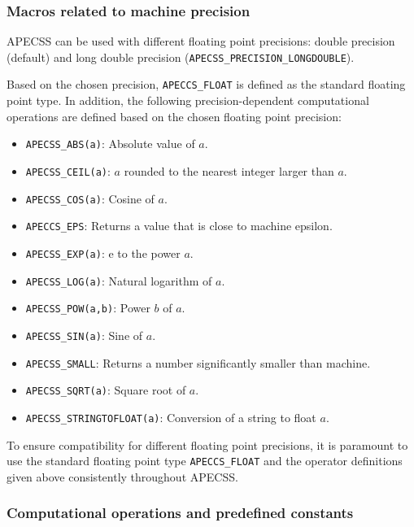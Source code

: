 \subsubsection{Macros related to machine precision}

APECSS can be used with different floating point precisions: double precision (default) and long double precision ({\tt APECSS\_PRECISION\_LONGDOUBLE}).

Based on the chosen precision, {\tt APECCS\_FLOAT} is defined as the standard floating point type. In addition, the following precision-dependent computational operations are defined based on the chosen floating point precision:\vspace{-1em}
\begin{itemize}[noitemsep]
  \item {\tt APECSS\_ABS(a)}: Absolute value of $a$.
  \item {\tt APECSS\_CEIL(a)}: $a$ rounded to the nearest integer larger than $a$.
  \item {\tt APECSS\_COS(a)}: Cosine of $a$.
  \item {\tt APECCS\_EPS}: Returns a value that is close to machine epsilon.
  \item {\tt APECSS\_EXP(a)}: $\text{e}$ to the power $a$.
  \item {\tt APECSS\_LOG(a)}: Natural logarithm of $a$.
  \item {\tt APECSS\_POW(a,b)}: Power $b$ of $a$.
  \item {\tt APECSS\_SIN(a)}: Sine of $a$.
  \item {\tt APECSS\_SMALL}: Returns a number significantly smaller than machine.
  \item {\tt APECSS\_SQRT(a)}: Square root of $a$.
  \item {\tt APECSS\_STRINGTOFLOAT(a)}: Conversion of a string to float $a$.
\end{itemize}
To ensure compatibility for different floating point precisions, it is paramount to use the standard floating point type {\tt APECCS\_FLOAT} and the operator definitions given above consistently throughout APECSS.

\subsubsection{Computational operations and predefined constants}

